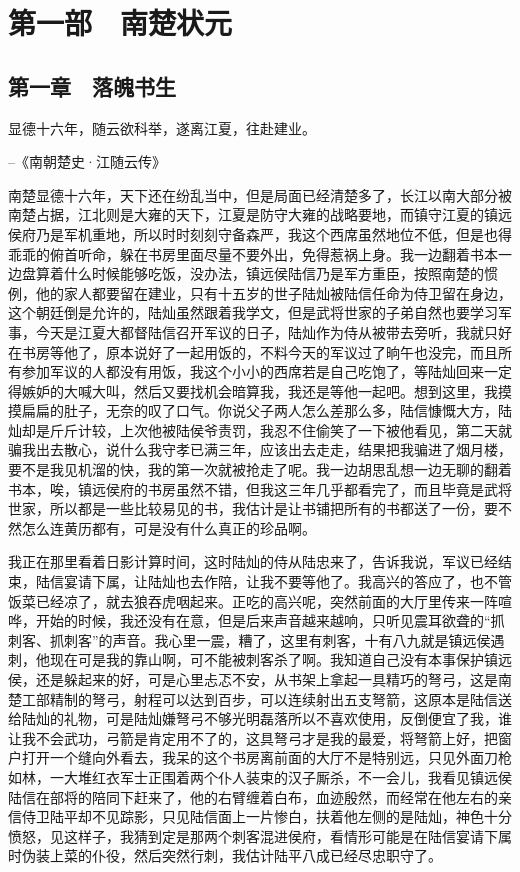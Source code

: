 \part{第一部　南楚状元}

\chapter{第一章　落魄书生}

显德十六年，随云欲科举，遂离江夏，往赴建业。

--《南朝楚史·江随云传》

南楚显德十六年，天下还在纷乱当中，但是局面已经清楚多了，长江以南大部分被南楚占据，江北则是大雍的天下，江夏是防守大雍的战略要地，而镇守江夏的镇远侯府乃是军机重地，所以时时刻刻守备森严，我这个西席虽然地位不低，但是也得乖乖的俯首听命，躲在书房里面尽量不要外出，免得惹祸上身。我一边翻着书本一边盘算着什么时候能够吃饭，没办法，镇远侯陆信乃是军方重臣，按照南楚的惯例，他的家人都要留在建业，只有十五岁的世子陆灿被陆信任命为侍卫留在身边，这个朝廷倒是允许的，陆灿虽然跟着我学文，但是武将世家的子弟自然也要学习军事，今天是江夏大都督陆信召开军议的日子，陆灿作为侍从被带去旁听，我就只好在书房等他了，原本说好了一起用饭的，不料今天的军议过了晌午也没完，而且所有参加军议的人都没有用饭，我这个小小的西席若是自己吃饱了，等陆灿回来一定得嫉妒的大喊大叫，然后又要找机会暗算我，我还是等他一起吧。想到这里，我摸摸扁扁的肚子，无奈的叹了口气。你说父子两人怎么差那么多，陆信慷慨大方，陆灿却是斤斤计较，上次他被陆侯爷责罚，我忍不住偷笑了一下被他看见，第二天就骗我出去散心，说什么我守孝已满三年，应该出去走走，结果把我骗进了烟月楼，要不是我见机溜的快，我的第一次就被抢走了呢。我一边胡思乱想一边无聊的翻着书本，唉，镇远侯府的书房虽然不错，但我这三年几乎都看完了，而且毕竟是武将世家，所以都是一些比较易见的书，我估计是让书铺把所有的书都送了一份，要不然怎么连黄历都有，可是没有什么真正的珍品啊。

我正在那里看着日影计算时间，这时陆灿的侍从陆忠来了，告诉我说，军议已经结束，陆信宴请下属，让陆灿也去作陪，让我不要等他了。我高兴的答应了，也不管饭菜已经凉了，就去狼吞虎咽起来。正吃的高兴呢，突然前面的大厅里传来一阵喧哗，开始的时候，我还没有在意，但是后来声音越来越响，只听见震耳欲聋的“抓刺客、抓刺客”的声音。我心里一震，糟了，这里有刺客，十有八九就是镇远侯遇刺，他现在可是我的靠山啊，可不能被刺客杀了啊。我知道自己没有本事保护镇远侯，还是躲起来的好，可是心里忐忑不安，从书架上拿起一具精巧的弩弓，这是南楚工部精制的弩弓，射程可以达到百步，可以连续射出五支弩箭，这原本是陆信送给陆灿的礼物，可是陆灿嫌弩弓不够光明磊落所以不喜欢使用，反倒便宜了我，谁让我不会武功，弓箭是肯定用不了的，这具弩弓才是我的最爱，将弩箭上好，把窗户打开一个缝向外看去，我呆的这个书房离前面的大厅不是特别远，只见外面刀枪如林，一大堆红衣军士正围着两个仆人装束的汉子厮杀，不一会儿，我看见镇远侯陆信在部将的陪同下赶来了，他的右臂缠着白布，血迹殷然，而经常在他左右的亲信侍卫陆平却不见踪影，只见陆信面上一片惨白，扶着他左侧的是陆灿，神色十分愤怒，见这样子，我猜到定是那两个刺客混进侯府，看情形可能是在陆信宴请下属时伪装上菜的仆役，然后突然行刺，我估计陆平八成已经尽忠职守了。

